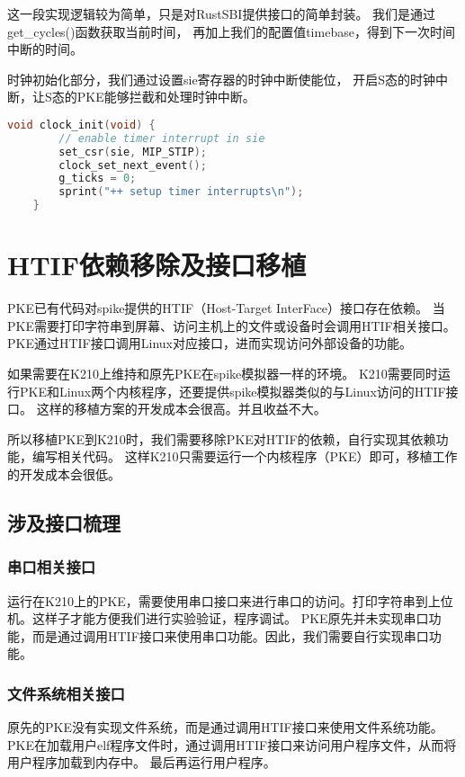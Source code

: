 这一段实现逻辑较为简单，只是对RustSBI提供接口的简单封装。
我们是通过get\_cycles()函数获取当前时间，
再加上我们的配置值timebase，得到下一次时间中断的时间。

时钟初始化部分，我们通过设置sie寄存器的时钟中断使能位，
开启S态的时钟中断，让S态的PKE能够拦截和处理时钟中断。

\begin{lstlisting}[caption={时钟初始化}, label={lst:clock_init}, language=C]
    void clock_init(void) {
        // enable timer interrupt in sie
        set_csr(sie, MIP_STIP);
        clock_set_next_event();
        g_ticks = 0;
        sprint("++ setup timer interrupts\n");
    }    
\end{lstlisting}

\section{HTIF依赖移除及接口移植}

PKE已有代码对spike提供的HTIF（Host-Target InterFace）接口存在依赖。
当PKE需要打印字符串到屏幕、访问主机上的文件或设备时会调用HTIF相关接口。
PKE通过HTIF接口调用Linux对应接口，进而实现访问外部设备的功能\cite{2019Porting}。

如果需要在K210上维持和原先PKE在spike模拟器一样的环境。
K210需要同时运行PKE和Linux两个内核程序，还要提供spike模拟器类似的与Linux访问的HTIF接口。
这样的移植方案的开发成本会很高。并且收益不大。

所以移植PKE到K210时，我们需要移除PKE对HTIF的依赖，自行实现其依赖功能，编写相关代码。
这样K210只需要运行一个内核程序（PKE）即可，移植工作的开发成本会很低。

\subsection{涉及接口梳理}

\subsubsection{串口相关接口}
运行在K210上的PKE，需要使用串口接口来进行串口的访问。打印字符串到上位机。这样子才能方便我们进行实验验证，程序调试。
PKE原先并未实现串口功能，而是通过调用HTIF接口来使用串口功能。因此，我们需要自行实现串口功能。

\subsubsection{文件系统相关接口}

原先的PKE没有实现文件系统，而是通过调用HTIF接口来使用文件系统功能。
PKE在加载用户elf程序文件时，通过调用HTIF接口来访问用户程序文件，从而将用户程序加载到内存中。
最后再运行用户程序。

